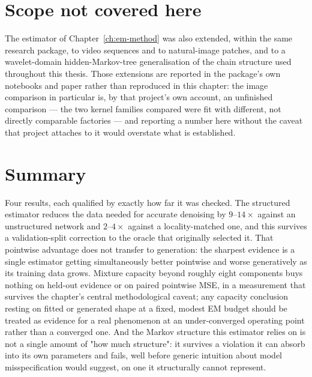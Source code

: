 \section{Scope not covered here}

The estimator of Chapter~\ref{ch:em-method} was also extended, within the
same research package, to video sequences and to natural-image patches, and
to a wavelet-domain hidden-Markov-tree generalisation of the chain
structure used throughout this thesis. Those extensions are reported in the
package's own notebooks and paper rather than reproduced in this chapter:
the image comparison in particular is, by that project's own account, an
unfinished comparison --- the two kernel families compared were fit with
different, not directly comparable factories --- and reporting a number here
without the caveat that project attaches to it would overstate what is
established.

\section{Summary}

Four results, each qualified by exactly how far it was checked. The
structured estimator reduces the data needed for accurate denoising by
$9$--$14\times$ against an unstructured network and $2$--$4\times$ against a
locality-matched one, and this survives a validation-split correction to
the oracle that originally selected it. That pointwise advantage does not
transfer to generation: the sharpest evidence is a single estimator getting
simultaneously better pointwise and worse generatively as its training data
grows. Mixture capacity beyond roughly eight components buys nothing on
held-out evidence or on paired pointwise MSE, in a measurement that survives
the chapter's central methodological caveat; any capacity conclusion resting
on fitted or generated shape at a fixed, modest EM budget should be treated
as evidence for a real phenomenon at an under-converged operating point
rather than a converged one. And the Markov structure this estimator relies
on is not a single amount of "how much structure": it survives a violation
it can absorb into its own parameters and fails, well before generic
intuition about model misspecification would suggest, on one it structurally
cannot represent.
